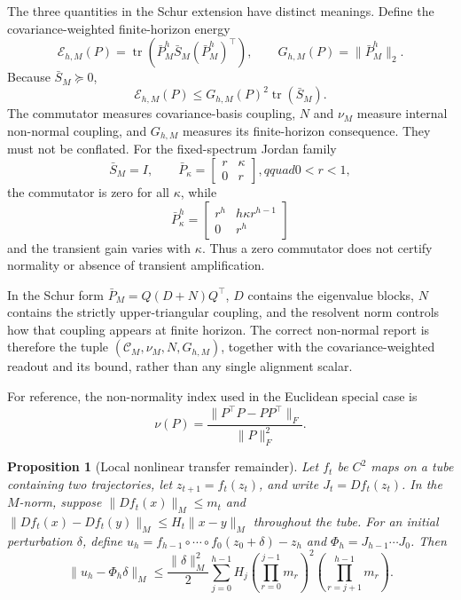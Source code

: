 \documentclass{article}
\DeclareMathOperator{\tr}{tr}
\newtheorem{suppprop}[supptheorem]{Proposition}
\begin{document}
The three quantities in the Schur extension have distinct meanings. Define
the covariance-weighted finite-horizon energy
\begin{equation}
\label{eq:supp-covariance-weighted-gain}
\mathcal E_{h,M}(P)=\tr\!\left(\bar P_M^h\bar S_M
(\bar P_M^h)^\top\right),
\qquad
G_{h,M}(P)=\|\bar P_M^h\|_2.
\end{equation}
Because $\bar S_M\succeq0$,
\begin{equation}
\label{eq:supp-covariance-energy-bound}
\mathcal E_{h,M}(P)\leq G_{h,M}(P)^2\tr(\bar S_M).
\end{equation}
The commutator measures covariance-basis coupling, $N$ and $\nu_M$ measure
internal non-normal coupling, and $G_{h,M}$ measures its finite-horizon
consequence. They must not be conflated. For the fixed-spectrum Jordan family
\begin{equation}
\label{eq:supp-jordan-counterexample}
\bar S_M=I,\qquad
\bar P_\kappa=\begin{bmatrix}r&\kappa\\0&r\end{bmatrix},qquad 0<r<1,
\end{equation}
the commutator is zero for all $\kappa$, while
\begin{equation}
\label{eq:supp-jordan-power}
\bar P_\kappa^h=\begin{bmatrix}r^h&h\kappa r^{h-1}\\0&r^h\end{bmatrix}
\end{equation}
and the transient gain varies with $\kappa$. Thus a zero commutator does not
certify normality or absence of transient amplification.

In the Schur form $\bar P_M=Q(D+N)Q^\top$, $D$ contains the eigenvalue
blocks, $N$ contains the strictly upper-triangular coupling, and the resolvent
norm controls how that coupling appears at finite horizon. The correct
non-normal report is therefore the tuple
$(\mathcal C_M,\nu_M,N,G_{h,M})$, together with the covariance-weighted
readout and its bound, rather than any single alignment scalar.

For reference, the non-normality index used in the Euclidean special case is
\begin{equation}
\label{eq:supp-nonnormality-index}
\nu(P)=\frac{\|P^\top P-PP^\top\|_F}{\|P\|_F^2}.
\end{equation}

\begin{suppprop}[Local nonlinear transfer remainder]
\label{prop:supp-nonlinear-remainder}
Let $f_t$ be $C^2$ maps on a tube containing two trajectories, let
$z_{t+1}=f_t(z_t)$, and write $J_t=Df_t(z_t)$. In the $M$-norm, suppose
$\|Df_t(x)\|_M\leq m_t$ and
$\|Df_t(x)-Df_t(y)\|_M\leq H_t\|x-y\|_M$ throughout the tube. For an
initial perturbation $\delta$, define
$u_h=f_{h-1}\circ\cdots\circ f_0(z_0+\delta)-z_h$ and
$\Phi_h=J_{h-1}\cdots J_0$. Then
\begin{equation}
\label{eq:supp-nonlinear-remainder}
\|u_h-\Phi_h\delta\|_M\leq \frac{\|\delta\|_M^2}{2}
\sum_{j=0}^{h-1}H_j
\left(\prod_{r=0}^{j-1}m_r\right)^2
\left(\prod_{r=j+1}^{h-1}m_r\right).
\end{equation}
\end{suppprop}
\end{document}
